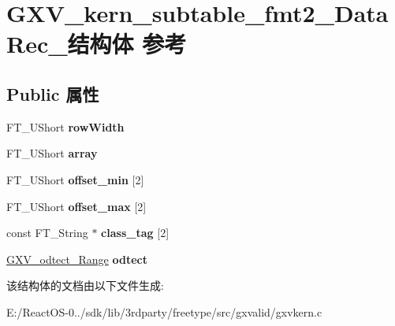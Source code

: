 \hypertarget{struct_g_x_v__kern__subtable__fmt2___data_rec__}{}\section{G\+X\+V\+\_\+kern\+\_\+subtable\+\_\+fmt2\+\_\+\+Data\+Rec\+\_\+结构体 参考}
\label{struct_g_x_v__kern__subtable__fmt2___data_rec__}
\subsection*{Public 属性}
\begin{DoxyCompactItemize}
\item 
\mbox{\label{struct_g_x_v__kern__subtable__fmt2___data_rec___acce05164fe0ae377307c75e485aa8c82}} 
F\+T\+\_\+\+U\+Short {\bfseries row\+Width}
\item 
\mbox{\label{struct_g_x_v__kern__subtable__fmt2___data_rec___af95024ab7bb1ac4d7d45d5a66a6f0c39}} 
F\+T\+\_\+\+U\+Short {\bfseries array}
\item 
\mbox{\label{struct_g_x_v__kern__subtable__fmt2___data_rec___a2b54c8210729a95fefd24e767fab709a}} 
F\+T\+\_\+\+U\+Short {\bfseries offset\+\_\+min} \mbox{[}2\mbox{]}
\item 
\mbox{\label{struct_g_x_v__kern__subtable__fmt2___data_rec___a91d151bb536c13eb9fe39f0283a59515}} 
F\+T\+\_\+\+U\+Short {\bfseries offset\+\_\+max} \mbox{[}2\mbox{]}
\item 
\mbox{\label{struct_g_x_v__kern__subtable__fmt2___data_rec___aa41296c81730ba3ad8a4a988831aa7bb}} 
const F\+T\+\_\+\+String $\ast$ {\bfseries class\+\_\+tag} \mbox{[}2\mbox{]}
\item 
\mbox{\label{struct_g_x_v__kern__subtable__fmt2___data_rec___a0760c0a483e4f436015fd984305c986e}} 
\hyperlink{struct_g_x_v__odtect___range_rec__}{G\+X\+V\+\_\+odtect\+\_\+\+Range} {\bfseries odtect}
\end{DoxyCompactItemize}


该结构体的文档由以下文件生成\+:\begin{DoxyCompactItemize}
\item 
E\+:/\+React\+O\+S-\/0../sdk/lib/3rdparty/freetype/src/gxvalid/gxvkern.\+c\end{DoxyCompactItemize}
